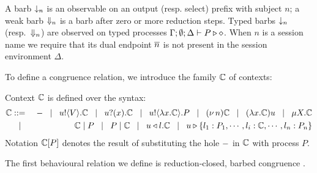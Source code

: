 \noi A barb $\downarrow_{n}$ is an observable on an output (resp. select) prefix with subject $n$;
a weak barb $\Downarrow_{n}$ is a barb after zero or more reduction steps.
Typed barbs $\downarrow_{n}$ (resp.\ $\Downarrow_{n}$)
are observed  on typed processes $\Gamma; \emptyset; \Delta \vdash P \triangleright \diamond$.
When $n$ is a session name we require that its dual endpoint $\overline{n}$ is not
present in the session environment $\Delta$.


To define a congruence relation, we introduce the family ${\mathbb{C}}$ of contexts:

\begin{definition}[Context]
	Context ${\mathbb{C}}$ is defined over the syntax:
%
	\begin{eqnarray*}
		{\mathbb{C}} & ::= & - \;\;\;|\;\;\; u ! \langle V \rangle . {\mathbb{C}} \;\;\;|\;\;\; u ? (x) . {\mathbb{C}} \;\;\;|\;\;\; u ! \langle \lambda x.{\mathbb{C}} \rangle . P \;\;\;|\;\;\; (\nu\, n) {\mathbb{C}} \;\;\;|\;\;\;
		(\lambda x.{\mathbb{C}})u \;\;\;|\;\;\; \mu X. {\mathbb{C}}\\ 
		& \;\;\;|\;\;\; & {\mathbb{C}} \;|\; P \;\;\;|\;\;\; P \;|\; {\mathbb{C}} \;\;\;|\;\;\; u \triangleleft l . {\mathbb{C}} \;\;\;|\;\;\; u \triangleright \{l_1:P_1,\cdots,l_i:{\mathbb{C}},\cdots,l_n:P_n\}
	\end{eqnarray*}
%
	Notation ${\mathbb{C}}[P]$ denotes the result of substituting 
	the hole $-$ in ${\mathbb{C}}$ with process $P$.
\end{definition}

\noi The first behavioural relation we define is reduction-closed, barbed congruence \cite{HondaKYoshida95}. 

